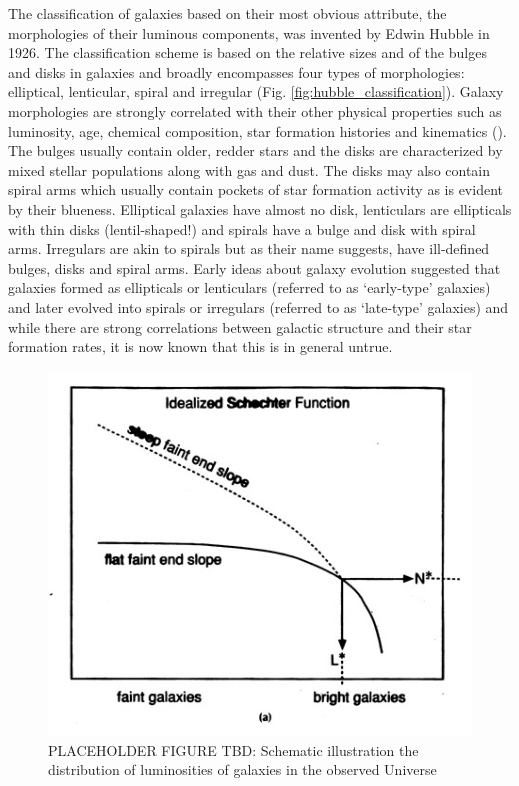 The classification of galaxies based on their most obvious attribute, the morphologies of their luminous components, was invented by Edwin Hubble in 1926. The classification scheme is based on the relative sizes and of the bulges and disks in galaxies and broadly encompasses four types of morphologies: elliptical, lenticular, spiral and irregular (Fig. \ref{fig:hubble_classification}). Galaxy morphologies are strongly correlated with their other physical properties such as luminosity, age, chemical composition, star formation histories and kinematics (\citealt{roberts94a}). The bulges usually contain older, redder stars and the disks are characterized by mixed stellar populations along with gas and dust. The disks may also contain spiral arms which usually contain pockets of star formation activity as is evident by their blueness. Elliptical galaxies have almost no disk, lenticulars are ellipticals with thin disks (lentil-shaped!) and spirals have a bulge and disk with spiral arms. Irregulars are akin to spirals but as their name suggests, have ill-defined bulges, disks and spiral arms. Early ideas about galaxy evolution suggested that galaxies formed as ellipticals or lenticulars (referred to as `early-type' galaxies) and later evolved into spirals or irregulars (referred to as `late-type' galaxies) and while there are strong correlations between galactic structure and their star formation rates, it is now known that this is in general untrue.\\

\begin{figure}
\includegraphics[width=\textwidth]{figures/luminosity_function}
\caption[PLACEHOLDER FIGURE TBD: Schematic illustration the distribution of luminosities of galaxies in the observed Universe]
{ PLACEHOLDER FIGURE TBD: Schematic illustration the distribution of luminosities of galaxies in the observed Universe
\label{fig:lum_func}}
\end{figure}


